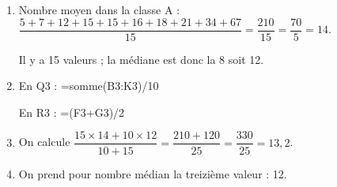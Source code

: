 
\medskip

\begin{enumerate}
\item Nombre moyen dans la classe A : $\dfrac{5 + 7 + 12 + 15 + 15 + 16 + 18 + 21 + 34 + 67}{15} = \dfrac{210}{15} = \dfrac{70}{5} = 14$.

Il y a 15 valeurs ; la médiane est donc la 8 soit 12.
\item En Q3  : =somme(B3\negthinspace:K3)/10

En R3 : =(F3+G3)/2
\item On calcule $\dfrac{15 \times 14 + 10 \times 12}{10 + 15} = \dfrac{210 + 120}{25} = \dfrac{330}{25} = 13,2$.
\item On prend pour nombre médian la treizième valeur : 12.
\end{enumerate}


